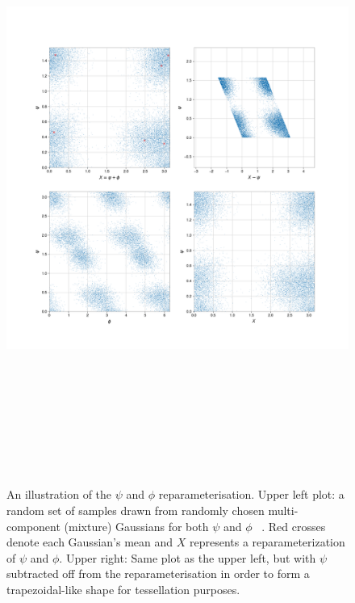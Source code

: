 \begin{figure}
    \centering
    \includegraphics[width=16cm,height=20cm,keepaspectratio]{figures/Xpsi.png}
    \caption[An illustration of the $\psi$ and $\phi$ reparameterisation.]{
    An illustration of the $\psi$ and $\phi$ reparameterisation. Upper left 
    plot: a random set of samples drawn from randomly chosen 
    multi-component (mixture) Gaussians for both $\psi$ and $\phi$
    ~. Red crosses denote each 
    Gaussian's mean and $X$ represents a reparameterization of 
    $\psi$ and $\phi$. Upper right: Same plot as the upper 
    left, 
    but with $\psi$ subtracted off from the reparameterisation in 
    order to form a trapezoidal-like shape for tessellation purposes. 
}
\end{figure}
